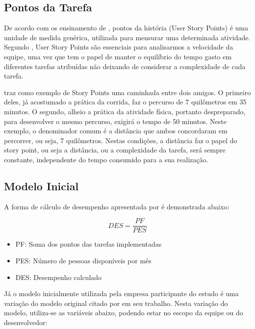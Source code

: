 \subsection{Pontos da Tarefa}
De acordo com os ensinamento de , pontos da história (User Story Points) é uma unidade de medida genérica, utilizada para mensurar uma determinada atividade. Segundo , User Story Points são essenciais para analisarmos a velocidade da equipe, uma vez que tem o papel de manter o equilíbrio do tempo gasto em diferentes tarefas atribuídas não deixando de considerar a complexidade de cada tarefa.\par
{} traz como exemplo de Story Points uma caminhada entre dois amigos. O primeiro deles, já acostumado a prática da corrida, faz o percurso de 7 quilômetros em 35 minutos. O segundo, alheio a prática da atividade física, portanto despreparado, para desenvolver o mesmo percurso, exigirá o tempo de 50 minutos. Neste exemplo, o denominador comum é a distância que ambos concordaram em percorrer, ou seja, 7 quilômetros. Nestas condições, a distância faz o papel do story point, ou seja a distância, ou a complexidade da tarefa, será sempre constante, independente do tempo consumido para a sua realização.

\subsection{Modelo Inicial}
A forma de cálculo de desempenho apresentada por  é demonstrada abaixo:

\bigskip

\begin{equation}
    DES = \frac{PF}{PES}
\end{equation}

\begin{itemize}
    \item PF: Soma dos pontos das tarefas implementadas
    \item PES: Número de pessoas disponíveis por mês
    \item DES: Desempenho calculado
\end{itemize}

\bigskip

Já o modelo inicialmente utilizada pela empresa participante do estudo é uma variação do modelo original citado por  em seu trabalho. Nesta variação do modelo, utiliza-se as variáveis abaixo, podendo estar no escopo da equipe ou do desenvolvedor:
\bigskip


